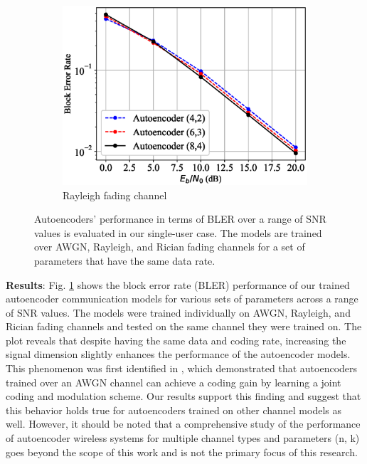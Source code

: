 \begin{figure}[tp!]
\begin{subfigure}{0.28\textwidth}
		\includegraphics[width=\linewidth]{figs/autoencoder_bler_rayleigh}
		\caption{Rayleigh fading channel}	
	\end{subfigure}
	\caption{Autoencoders' performance in terms of BLER over a range of SNR values is evaluated in our single-user case. The models are trained over AWGN, Rayleigh, and Rician fading channels for a set of parameters that have the same data rate.}
	\label{fig:autoencoder_bler}
\end{figure}

\textbf{Results}: Fig. \ref{fig:autoencoder_bler} shows the block error rate (BLER) performance of our trained autoencoder communication models for various sets of parameters across a range of SNR values. The models were trained individually on AWGN, Rayleigh, and Rician fading channels and tested on the same channel they were trained on.
The plot reveals that despite having the same data and coding rate, increasing the signal dimension slightly enhances the performance of the autoencoder models. This phenomenon was first identified in \cite{o2017introduction}, which demonstrated that autoencoders trained over an AWGN channel can achieve a coding gain by learning a joint coding and modulation scheme. Our results support this finding and suggest that this behavior holds true for autoencoders trained on other channel models as well. However, it should be noted that a comprehensive study of the performance of autoencoder wireless systems for multiple channel types and parameters (n, k) goes beyond the scope of this work and is not the primary focus of this research.


